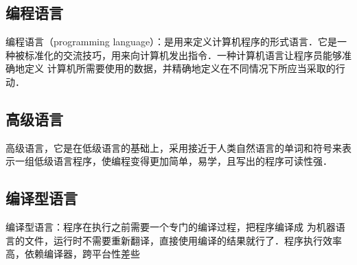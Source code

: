 \subsection{编程语言}\label{CpLgg_sub5}

编程语言（programming language）：是用来定义计算机程序的形式语言．它是一种被标准化的交流技巧，用来向计算机发出指令．一种计算机语言让程序员能够准确地定义
计算机所需要使用的数据，并精确地定义在不同情况下所应当采取的行动．

\subsection{高级语言}\label{CpLgg_sub6}

高级语言，它是在低级语言的基础上，采用接近于人类自然语言的单词和符号来表示一组低级语言程序，使编程变得更加简单，易学，且写出的程序可读性强．

\subsection{编译型语言}\label{CpLgg_sub7}

编译型语言：程序在执行之前需要一个专门的编译过程，把程序编译成 为机器语言的文件，运行时不需要重新翻译，直接使用编译的结果就行了．程序执行效率高，依赖编译器，跨平台性差些
